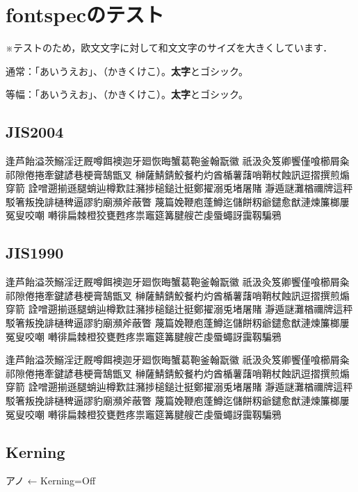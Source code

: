 \documentclass{article}
\begin{document}
\section{fontspecのテスト}

※テストのため，欧文文字に対して和文文字のサイズを大きくしています．

\noindent 通常：「あいうえお」、（かきくけこ）。{\bf 太字}と{\gt ゴシック}。

{
\noindent 等幅：「あいうえお」、（かきくけこ）。{\bf 太字}と{\gt ゴシック}。
}

\subsection{JIS2004}
逢芦飴溢茨鰯淫迂厩噂餌襖迦牙廻恢晦蟹葛鞄釜翰翫徽
祇汲灸笈卿饗僅喰櫛屑粂祁隙倦捲牽鍵諺巷梗膏鵠甑叉
榊薩鯖錆鮫餐杓灼酋楯薯藷哨鞘杖蝕訊逗摺撰煎煽穿箭
詮噌遡揃遜腿蛸辿樽歎註瀦捗槌鎚辻挺鄭擢溺兎堵屠賭
瀞遁謎灘楢禰牌這秤駁箸叛挽誹樋稗逼謬豹廟瀕斧蔽瞥
蔑篇娩鞭庖蓬鱒迄儲餅籾爺鑓愈猷漣煉簾榔屢冤叟咬嘲
囀徘扁棘橙狡甕甦疼祟竈筵篝腱艘芒虔蜃蠅訝靄靱騙鴉

\subsection{JIS1990}
{\ipajisninety
逢芦飴溢茨鰯淫迂厩噂餌襖迦牙廻恢晦蟹葛鞄釜翰翫徽
祇汲灸笈卿饗僅喰櫛屑粂祁隙倦捲牽鍵諺巷梗膏鵠甑叉
榊薩鯖錆鮫餐杓灼酋楯薯藷哨鞘杖蝕訊逗摺撰煎煽穿箭
詮噌遡揃遜腿蛸辿樽歎註瀦捗槌鎚辻挺鄭擢溺兎堵屠賭
瀞遁謎灘楢禰牌這秤駁箸叛挽誹樋稗逼謬豹廟瀕斧蔽瞥
蔑篇娩鞭庖蓬鱒迄儲餅籾爺鑓愈猷漣煉簾榔屢冤叟咬嘲
囀徘扁棘橙狡甕甦疼祟竈筵篝腱艘芒虔蜃蠅訝靄靱騙鴉

\noindent
{}
逢芦飴溢茨鰯淫迂厩噂餌襖迦牙廻恢晦蟹葛鞄釜翰翫徽
祇汲灸笈卿饗僅喰櫛屑粂祁隙倦捲牽鍵諺巷梗膏鵠甑叉
榊薩鯖錆鮫餐杓灼酋楯薯藷哨鞘杖蝕訊逗摺撰煎煽穿箭
詮噌遡揃遜腿蛸辿樽歎註瀦捗槌鎚辻挺鄭擢溺兎堵屠賭
瀞遁謎灘楢禰牌這秤駁箸叛挽誹樋稗逼謬豹廟瀕斧蔽瞥
蔑篇娩鞭庖蓬鱒迄儲餅籾爺鑓愈猷漣煉簾榔屢冤叟咬嘲
囀徘扁棘橙狡甕甦疼祟竈筵篝腱艘芒虔蜃蠅訝靄靱騙鴉
}

\vspace{1\zw}

\subsection{Kerning}
{

アノ ← Kerning=Off

}
\end{document}
